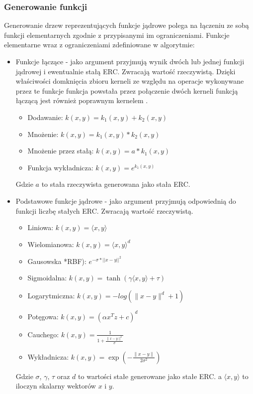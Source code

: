 \subsubsection{Generowanie funkcji}
Generowanie drzew reprezentujących funkcje jądrowe polega na łączeniu ze sobą funkcji elementarnych zgodnie z  przypisanymi im ograniczeniami.
Funkcje elementarne wraz z ograniczeniami zdefiniowane w algorytmie:
\begin{itemize}
\item Funkcje łączące - jako argument przyjmują wynik dwóch lub jednej funkcji jądrowej i ewentualnie stałą ERC. Zwracają wartość rzeczywistą. Dzięki właściwości domknięcia zbioru kerneli ze względu na operacje wykonywane przez te funkcje funkcja powstała przez połączenie dwóch kerneli funkcją łączącą jest również poprawnym kernelem \cite{Shawe-Taylor:2004:KMP:975545}.
	\begin{itemize}
	\item Dodawanie: $ k(x, y) = k_1(x,y) + k_2(x,y) $
	\item Mnożenie: $ k(x, y) = k_1(x,y) * k_2(x,y) $	
	\item Mnożenie przez stałą: $ k(x, y) = a * k_1(x,y) $
	\item Funkcja wykładnicza: $ k(x, y) = e ^{k_1(x,y)} $
	\end{itemize}
	Gdzie $ a $ to stała rzeczywista generowana jako stała ERC.
\item Podstawowe funkcje jądrowe - jako argument przyjmują odpowiednią do funkcji liczbę stałych ERC. Zwracają wartość rzeczywistą.
	\begin{itemize}
	\item Liniowa: $ k(x, y) = \langle x,y \rangle $	
	\item Wielomianowa: $ k(x, y) = \langle x,y \rangle ^d $
	\item Gausowska *RBF): $ e^{-\sigma*||x-y||^2} $	
	\item Sigmoidalna: $ k(x, y) = \tanh(\gamma \langle x,y \rangle + \tau) $
	\item Logarytmiczna: $ k(x, y) = - log (\lVert x-y \rVert ^d + 1) $
	\item Potęgowa: $ k(x, y) = (\alpha x^T z + c)^d $
	\item Cauchego: $ k(x, y) = \frac{1}{1 + \frac{\lVert x-y \rVert^2}{\sigma} } $ 
	\item Wykładnicza: $ k(x, y) = \exp\left(-\frac{ \lVert x-y \rVert }{2\sigma^2}\right) $
	\end{itemize}
	Gdzie $ \sigma $, $ \gamma $, $ \tau $ oraz $ d $ to wartości stałe generowane jako stałe ERC. a $ \langle x,y \rangle $ to iloczyn skalarny wektorów $x$ i $y$.

\end{itemize}
